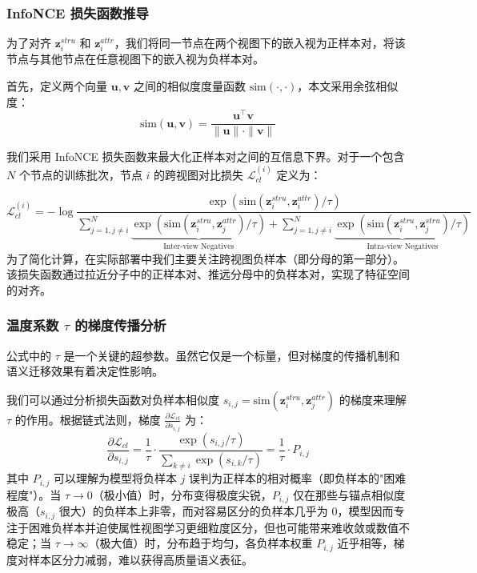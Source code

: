 \subsubsection{InfoNCE 损失函数推导}
为了对齐 $\mathbf{z}_i^{stru}$ 和 $\mathbf{z}_i^{attr}$，我们将同一节点在两个视图下的嵌入视为{\songti 正样本对}，将该节点与其他节点在任意视图下的嵌入视为{\songti 负样本对}。

首先，定义两个向量 $\mathbf{u}, \mathbf{v}$ 之间的相似度度量函数 $\text{sim}(\cdot, \cdot)$，本文采用余弦相似度：
\begin{equation}
    \text{sim}(\mathbf{u}, \mathbf{v}) = \frac{\mathbf{u}^\top \mathbf{v}}{\|\mathbf{u}\| \cdot \|\mathbf{v}\|}
\end{equation}

我们采用 InfoNCE 损失函数来最大化正样本对之间的互信息下界。对于一个包含 $N$ 个节点的训练批次，节点 $i$ 的跨视图对比损失 $\mathcal{L}_{cl}^{(i)}$ 定义为：

\begin{equation}
    \mathcal{L}_{cl}^{(i)} = - \log \frac{\exp(\text{sim}(\mathbf{z}_i^{stru}, \mathbf{z}_i^{attr}) / \tau)}{\sum_{j=1, j \neq i}^{N} \underbrace{\exp(\text{sim}(\mathbf{z}_i^{stru}, \mathbf{z}_j^{attr}) / \tau)}_{\text{Inter-view Negatives}} + \sum_{j=1, j \neq i}^{N} \underbrace{\exp(\text{sim}(\mathbf{z}_i^{stru}, \mathbf{z}_j^{stru}) / \tau)}_{\text{Intra-view Negatives}}}
    \label{eq:cl_loss}
\end{equation}
为了简化计算，在实际部署中我们主要关注跨视图负样本（即分母的第一部分）。该损失函数通过拉近分子中的正样本对、推远分母中的负样本对，实现了特征空间的对齐\cite{wu2021sgl, yu2022simgcl}。

\subsubsection{温度系数 \texorpdfstring{$\tau$}{tau} 的梯度传播分析}
公式中的 $\tau$ 是一个关键的超参数。虽然它仅是一个标量，但对梯度的传播机制和语义迁移效果有着决定性影响。

我们可以通过分析损失函数对负样本相似度 $s_{i,j} = \text{sim}(\mathbf{z}_i^{stru}, \mathbf{z}_j^{attr})$ 的梯度来理解 $\tau$ 的作用。根据链式法则，梯度 $\frac{\partial \mathcal{L}_{cl}}{\partial s_{i,j}}$ 为：
\begin{equation}
    \frac{\partial \mathcal{L}_{cl}}{\partial s_{i,j}} = \frac{1}{\tau} \cdot \frac{\exp(s_{i,j}/\tau)}{\sum_{k \neq i} \exp(s_{i,k}/\tau)} = \frac{1}{\tau} \cdot P_{i,j}
\end{equation}
其中 $P_{i,j}$ 可以理解为模型将负样本 $j$ 误判为正样本的相对概率（即负样本的"困难程度"）。当 $\tau \to 0$（极小值）时，分布变得极度尖锐，$P_{i,j}$ 仅在那些与锚点相似度极高（$s_{i,j}$ 很大）的负样本上非零，而对容易区分的负样本几乎为 0，模型因而专注于困难负样本并迫使属性视图学习更细粒度区分，但也可能带来难收敛或数值不稳定；当 $\tau \to \infty$（极大值）时，分布趋于均匀，各负样本权重 $P_{i,j}$ 近乎相等，梯度对样本区分力减弱，难以获得高质量语义表征。

